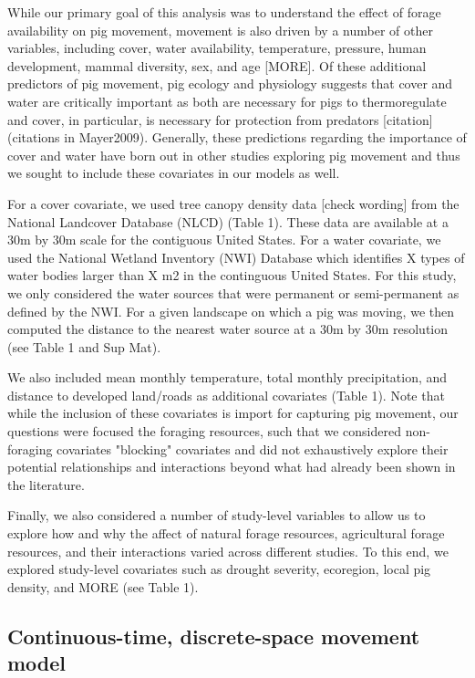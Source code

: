 \documentclass[a4paper]{article}
\begin{document}
While our primary goal of this analysis was to understand the effect of forage availability on pig movement, movement is also driven by a number of other variables, including cover, water availability, temperature, pressure, human development, mammal diversity, sex, and age \citep{McClure2015,Garza2017,Kay2017} [MORE].  Of these additional predictors of pig movement, pig ecology and physiology suggests that cover and water are critically important as both are necessary for pigs to thermoregulate \citep{Choquenot1996a} and cover, in particular, is necessary for protection from predators [citation] (citations in Mayer2009). Generally, these predictions regarding the importance of cover and water have born out in other studies exploring pig movement\citep[e.g.][]{Kay2017} and thus we sought to include these covariates in our models as well.

For a cover covariate, we used tree canopy density data [check wording] from the National Landcover Database (NLCD) (Table 1). These data are available at a 30m by 30m scale for the contiguous United States. For a water covariate, we used the National Wetland Inventory (NWI) Database which identifies X types of water bodies larger than X m2 in the continguous United States. For this study, we only considered the water sources that were permanent or semi-permanent as defined by the NWI. For a given landscape on which a pig was moving, we then computed the distance to the nearest water source at a 30m by 30m resolution (see Table 1 and Sup Mat). 

We also included mean monthly temperature, total monthly precipitation, and distance to developed land/roads as additional covariates (Table 1). Note that while the inclusion of these covariates is import for capturing pig movement, our questions were focused the foraging resources, such that we considered non-foraging covariates "blocking" covariates and did not exhaustively explore their potential relationships and interactions beyond what had already been shown in the literature.  

Finally, we also considered a number of study-level variables to allow us to explore how and why the affect of natural forage resources, agricultural forage resources, and their interactions varied across different studies. To this end, we explored study-level covariates such as drought severity, ecoregion, local pig density, and MORE (see Table 1). 

\subsection*{Continuous-time, discrete-space movement model}
\end{document}

